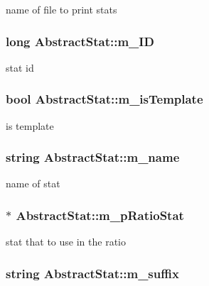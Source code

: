 \label{classAbstractStat_acc58d3d15674660dbf0955193712d36f}
name of file to print stats \hypertarget{classAbstractStat_aaa8defb9f5bac0e43ad521ee64334a43}{
\subsubsection[{m\_\-ID}]{\setlength{\rightskip}{0pt plus 5cm}long {\bf AbstractStat::m\_\-ID}}}
\label{classAbstractStat_aaa8defb9f5bac0e43ad521ee64334a43}
stat id \hypertarget{classAbstractStat_aa26aa9ab90712eec3ca55ec236729d9b}{
\subsubsection[{m\_\-isTemplate}]{\setlength{\rightskip}{0pt plus 5cm}bool {\bf AbstractStat::m\_\-isTemplate}}}
\label{classAbstractStat_aa26aa9ab90712eec3ca55ec236729d9b}
is template \hypertarget{classAbstractStat_a0364622ef4333da55eb4ff1ce94444c5}{
\subsubsection[{m\_\-name}]{\setlength{\rightskip}{0pt plus 5cm}string {\bf AbstractStat::m\_\-name}}}
\label{classAbstractStat_a0364622ef4333da55eb4ff1ce94444c5}
name of stat \hypertarget{classAbstractStat_a4b62c42003dcc7db965a323a2df01089}{
\subsubsection[{m\_\-pRatioStat}]{$\ast$ {\bf AbstractStat::m\_\-pRatioStat}}}
\label{classAbstractStat_a4b62c42003dcc7db965a323a2df01089}
stat that to use in the ratio \hypertarget{classAbstractStat_af7f98a59844e9417602d28b4849ef105}{
\subsubsection[{m\_\-suffix}]{\setlength{\rightskip}{0pt plus 5cm}string {\bf AbstractStat::m\_\-suffix}}}
